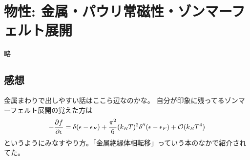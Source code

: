 \documentclass[../../master.tex]{subfiles}
\begin{document}
\chapter{物性: 金属・パウリ常磁性・ゾンマーフェルト展開}
略

\section*{感想}
金属まわりで出しやすい話はここら辺なのかな。
自分が印象に残ってるゾンマーフェルト展開の覚えた方は
\begin{equation*}\begin{aligned}[b]
    -\pdv{f}{\epsilon}
    = \delta(\epsilon-\epsilon_F) + \frac{\pi^2}{6}(k_BT)^2\delta''(\epsilon-\epsilon_F) +\mathcal{O}(k_BT^4)
\end{aligned}\end{equation*}
というようにみなすやり方。「金属絶縁体相転移」っていう本のなかで紹介されてた。
\end{document}
